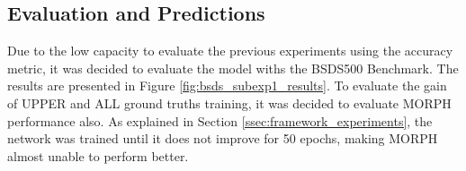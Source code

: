 % 
% 

\subsection{Evaluation and Predictions}
\label{ssec:basic_pred_eval}

Due to the low capacity to evaluate the previous experiments using the accuracy metric, it was decided to evaluate the model withs the BSDS500 Benchmark.
The results are presented in Figure \ref{fig:bsds_subexp1_results}. %
To evaluate the gain of UPPER and ALL ground truths training, it was decided to evaluate MORPH performance also.
As explained in Section \ref{ssec:framework_experiments}, the network was trained until it does not improve for 50 epochs, making MORPH almost unable to perform better.

